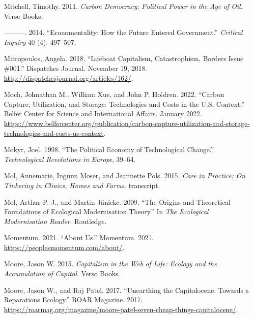 \documentclass[a4paper, nobind]{templates/ociamthesis}
\newlength{\cslhangindent}
\newenvironment{CSLReferences}[2] %
 {%
  \setlength{\parindent}{0pt}
  \ifodd #1
  \let\oldpar\par
  \def\par{\hangindent=\cslhangindent\oldpar}
  \fi
  \setlength{\parskip}{1mm}
  \setlength{\baselineskip}{6mm}
 }%
 {}
\begin{document}
\begin{CSLReferences}{1}{0}
\leavevmode{}%
Mitchell, Timothy. 2011. \emph{Carbon {Democracy}: {Political Power} in the {Age} of {Oil}}. {Verso Books}.

\leavevmode{}%
---------. 2014. {``Economentality: {How} the {Future Entered Government}.''} \emph{Critical Inquiry} 40 (4): 497--507.

\leavevmode{}%
Mitropoulos, Angela. 2018. {``Lifeboat {Capitalism}, {Catastrophism}, {Borders} \textbar{} {Issue} \#001.''} {Dispatches Journal}. November 19, 2018. \url{http://dispatchesjournal.org/articles/162/}.

\leavevmode{}%
Moch, Johnathan M., William Xue, and John P. Holdren. 2022. {``Carbon {Capture}, {Utilization}, and {Storage}: {Technologies} and {Costs} in the {U}.{S}. {Context}.''} {Belfer Center for Science and International Affairs}. January 2022. \url{https://www.belfercenter.org/publication/carbon-capture-utilization-and-storage-technologies-and-costs-us-context}.

\leavevmode{}%
Mokyr, Joel. 1998. {``The Political Economy of Technological Change.''} \emph{Technological Revolutions in Europe}, 39--64.

\leavevmode{}%
Mol, Annemarie, Ingunn Moser, and Jeannette Pols. 2015. \emph{Care in {Practice}: {On Tinkering} in {Clinics}, {Homes} and {Farms}}. {transcript}.

\leavevmode{}%
Mol, Arthur P. J., and Martin Jänicke. 2009. {``The {Origins} and {Theoretical Foundations} of {Ecological Modernisation Theory}.''} In \emph{The {Ecological Modernisation Reader}}. {Routledge}.

\leavevmode{}%
Momentum. 2021. {``About {Us}.''} {Momentum}. 2021. \url{https://peoplesmomentum.com/about/}.

\leavevmode{}%
Moore, Jason W. 2015. \emph{Capitalism in the {Web} of {Life}: {Ecology} and the {Accumulation} of {Capital}}. {Verso Books}.

\leavevmode{}%
Moore, Jason W., and Raj Patel. 2017. {``Unearthing the {Capitalocene}: {Towards} a {Reparations Ecology}.''} {ROAR Magazine}. 2017. \url{https://roarmag.org/magazine/moore-patel-seven-cheap-things-capitalocene/}.


\end{CSLReferences}
\end{document}
